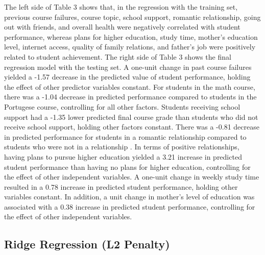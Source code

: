 \documentclass[sigconf]{acmart}
\begin{document}

The left side of Table 3 shows that, in the regression with the training set, 
previous course failures, course topic, school support, romantic relationship, 
going out with friends, and overall health were negatively correlated with 
student performance, whereas plans for higher education, study time, mother's
education level, internet access, quality of family relations, and father's 
job were positively related to student achievement. The right side of Table 3
shows the final regression model with the testing set. A one-unit change in 
past course failures yielded a -1.57 decrease in the predicted value of 
student performance, holding the effect of other predictor variables constant. 
For students in the math course, there was a -1.04 decrease in predicted 
performance compared to students in the Portugese course, controlling for all 
other factors. Students receiving school support had a -1.35 lower predicted 
final course grade than students who did not receive school support, holding
other factors constant. There was a -0.81 decrease in predicted performance 
for students in a romantic relationship compared to students who were not in 
a relationship . In terms of positive relationships, having plans to pursue 
higher education yielded a 3.21 increase in predicted student performance 
than having no plans for higher education, controlling for the effect of other
independent variables. A one-unit change in weekly study time resulted in a 
0.78 increase in predicted student performance, holding other variables 
constant. In addition, a unit change in mother's level of education was 
associated with a 0.38 increase in predicted student performance, controlling 
for the effect of other independent variables. 


\subsection{Ridge Regression (L2 Penalty)}
\end{document}
